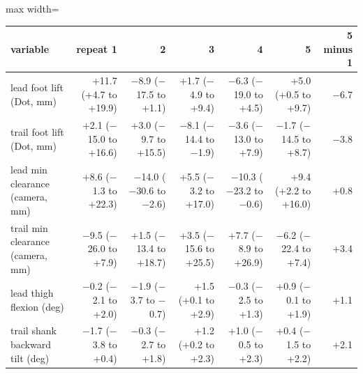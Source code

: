 \begin{adjustbox}{max width=\textwidth}
{\scriptsize
\begin{tabular}{p{4.6cm}rrrrrr}
\toprule
\textbf{variable} & \textbf{repeat 1} & \textbf{2} & \textbf{3} & \textbf{4} & \textbf{5} & \textbf{5 minus 1} \\
\midrule
lead foot lift (Dot, mm) & +11.7 (+4.7 to +19.9) & $-$8.9 ($-$17.5 to +1.1) & +1.7 ($-$4.9 to +9.4) & $-$6.3 ($-$19.0 to +4.5) & +5.0 (+0.5 to +9.7) & $-$6.7 \\
trail foot lift (Dot, mm) & +2.1 ($-$15.0 to +16.6) & +3.0 ($-$9.7 to +15.5) & $-$8.1 ($-$14.4 to $-$1.9) & $-$3.6 ($-$13.0 to +7.9) & $-$1.7 ($-$14.5 to +8.7) & $-$3.8 \\
lead min clearance (camera, mm) & +8.6 ($-$1.3 to +22.3) & $-$14.0 ($-$30.6 to $-$2.6) & +5.5 ($-$3.2 to +17.0) & $-$10.3 ($-$23.2 to $-$0.6) & +9.4 (+2.2 to +16.0) & +0.8 \\
trail min clearance (camera, mm) & $-$9.5 ($-$26.0 to +7.9) & +1.5 ($-$13.4 to +18.7) & +3.5 ($-$15.6 to +25.5) & +7.7 ($-$8.9 to +26.9) & $-$6.2 ($-$22.4 to +7.4) & +3.4 \\
lead thigh flexion (deg) & $-$0.2 ($-$2.1 to +2.0) & $-$1.9 ($-$3.7 to $-$0.7) & +1.5 (+0.1 to +2.9) & $-$0.3 ($-$2.5 to +1.3) & +0.9 ($-$0.1 to +1.9) & +1.1 \\
trail shank backward tilt (deg) & $-$1.7 ($-$3.8 to +0.4) & $-$0.3 ($-$2.7 to +1.8) & +1.2 (+0.2 to +2.3) & +1.0 ($-$0.5 to +2.3) & +0.4 ($-$1.5 to +2.2) & +2.1 \\
\bottomrule
\end{tabular}
}
\end{adjustbox}
